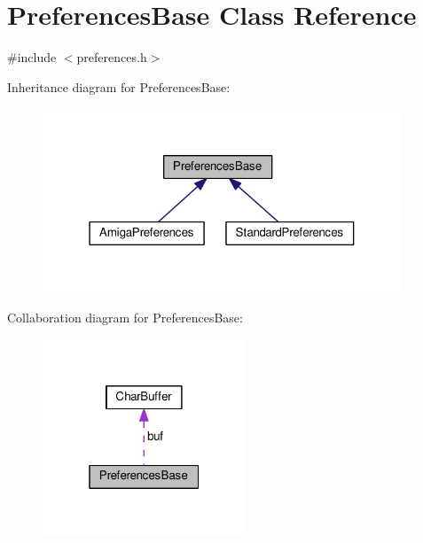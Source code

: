 \hypertarget{classPreferencesBase}{}\section{Preferences\+Base Class Reference}
\label{classPreferencesBase}


{\ttfamily \#include $<$preferences.\+h$>$}



Inheritance diagram for Preferences\+Base\+:\nopagebreak
\begin{figure}[H]
\begin{center}
\leavevmode
\includegraphics[width=304pt]{classPreferencesBase__inherit__graph}
\end{center}
\end{figure}


Collaboration diagram for Preferences\+Base\+:\nopagebreak
\begin{figure}[H]
\begin{center}
\leavevmode
\includegraphics[width=172pt]{classPreferencesBase__coll__graph}
\end{center}
\end{figure}
